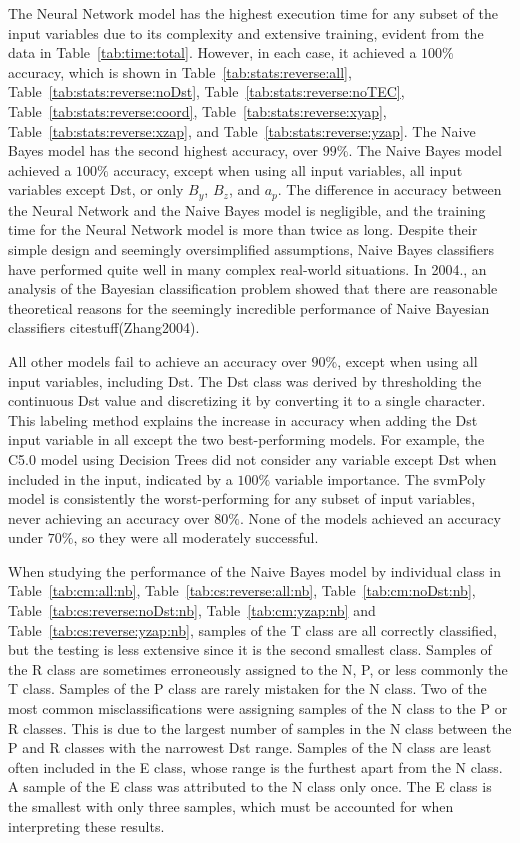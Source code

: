 \documentclass[preprint,12pt]{elsarticle}
\begin{document}
The Neural Network model has the highest execution time for any subset of the input variables due to its complexity and extensive training, evident from the data in Table~\ref{tab:time:total}. However, in each case, it achieved a $100\%$ accuracy, which is shown in Table~\ref{tab:stats:reverse:all}, Table~\ref{tab:stats:reverse:noDst}, Table~\ref{tab:stats:reverse:noTEC}, Table~\ref{tab:stats:reverse:coord}, Table~\ref{tab:stats:reverse:xyap}, Table~\ref{tab:stats:reverse:xzap}, and Table~\ref{tab:stats:reverse:yzap}. The Naive Bayes model has the second highest accuracy, over $99\%$. The Naive Bayes model achieved a $100\%$ accuracy, except when using all input variables, all input variables except Dst, or only $B_{y}$, $B_{z}$, and $a_{p}$. The difference in accuracy between the Neural Network and the Naive Bayes model is negligible, and the training time for the Neural Network model is more than twice as long. Despite their simple design and seemingly oversimplified assumptions, Naive Bayes classifiers have performed quite well in many complex real-world situations. In 2004., an analysis of the Bayesian classification problem showed that there are reasonable theoretical reasons for the seemingly incredible performance of Naive Bayesian classifiers citestuff(Zhang2004).

All other models fail to achieve an accuracy over $90\%$, except when using all input variables, including Dst. The Dst class was derived by thresholding the continuous Dst value and discretizing it by converting it to a single character. This labeling method explains the increase in accuracy when adding the Dst input variable in all except the two best-performing models. For example, the C5.0 model using Decision Trees did not consider any variable except Dst when included in the input, indicated by a $100\%$ variable importance. The svmPoly model is consistently the worst-performing for any subset of input variables, never achieving an accuracy over $80\%$. None of the models achieved an accuracy under $70\%$, so they were all moderately successful.

When studying the performance of the Naive Bayes model by individual class in Table~\ref{tab:cm:all:nb}, Table~\ref{tab:cs:reverse:all:nb}, Table~\ref{tab:cm:noDst:nb}, Table~\ref{tab:cs:reverse:noDst:nb}, Table~\ref{tab:cm:yzap:nb} and Table~\ref{tab:cs:reverse:yzap:nb}, samples of the T class are all correctly classified, but the testing is less extensive since it is the second smallest class. Samples of the R class are sometimes erroneously assigned to the N, P, or less commonly the T class. Samples of the P class are rarely mistaken for the N class. Two of the most common misclassifications were assigning samples of the N class to the P or R classes. This is due to the largest number of samples in the N class between the P and R classes with the narrowest Dst range. Samples of the N class are least often included in the E class, whose range is the furthest apart from the N class. A sample of the E class was attributed to the N class only once. The E class is the smallest with only three samples, which must be accounted for when interpreting these results.
\end{document}
